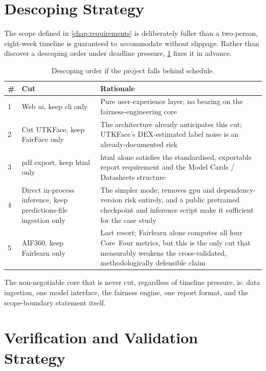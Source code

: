 \section{Descoping Strategy}
\label{sec:cutlist}

The scope defined in \cref{chap:requirements} is deliberately fuller than a two-person, eight-week timeline is guaranteed to accommodate without slippage. Rather than discover a descoping order under deadline pressure, \cref{tab:cutlist} fixes it in advance.

\begin{table}[htbp]
    \centering
    \renewcommand{\arraystretch}{1.3}
    \caption{Descoping order if the project falls behind schedule.}
    \label{tab:cutlist}
    \begin{tabular}{p{0.6cm}p{3.6cm}p{7.3cm}}
        \toprule
        \textbf{\#} & \textbf{Cut} & \textbf{Rationale} \\
        \midrule
        1 & Web \gls{ui}, keep \gls{cli} only & Pure user-experience layer; no bearing on the fairness-engineering core \\
        2 & Cut UTKFace, keep FairFace only & The architecture already anticipates this cut; UTKFace's DEX-estimated label noise is an already-documented risk \\
        3 & \gls{pdf} export, keep \gls{html} only & \gls{html} alone satisfies the standardised, exportable report requirement and the Model Cards / Datasheets structure \\
        4 & Direct in-process inference, keep predictions-file ingestion only & The simpler mode; removes \gls{gpu} and dependency-version risk entirely, and a public pretrained checkpoint and inference script make it sufficient for the case study \\
        5 & AIF360, keep Fairlearn only & Last resort; Fairlearn alone computes all four Core~Four metrics, but this is the only cut that measurably weakens the cross-validated, methodologically defensible claim \\
        \bottomrule
    \end{tabular}
\end{table}

The non-negotiable core that is never cut, regardless of timeline pressure, is: data ingestion, one model interface, the fairness engine, one report format, and the scope-boundary statement itself.

\section{Verification and Validation Strategy}


